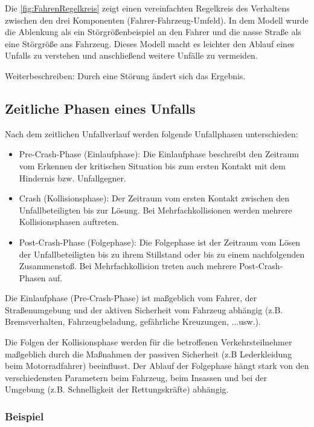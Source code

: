 Die \autoref{fig:FahrenRegelkreis} zeigt einen vereinfachten Regelkreis des Verhaltens zwischen den drei Komponenten (Fahrer-Fahrzeug-Umfeld). In dem Modell wurde die Ablenkung als ein Störgrößenbeispiel an den Fahrer und die nasse Straße als eine Störgröße ans Fahrzeug. Dieses Modell macht es leichter den Ablauf eines Unfalls zu verstehen und anschließend weitere Unfälle zu vermeiden.

Weiterbeschreiben: Durch eine Störung ändert sich das Ergebnis.

%
\subsection{Zeitliche Phasen eines Unfalls}

Nach dem zeitlichen Unfallverlauf werden folgende Unfallphasen unterschieden:
\begin{itemize}
	\item Pre-Crash-Phase (Einlaufphase): 
	Die Einlaufphase beschreibt den Zeitraum vom Erkennen der kritischen Situation bis zum ersten Kontakt mit dem Hindernis bzw. Unfallgegner.
	\item Crash (Kollisionsphase):
	Der Zeitraum vom ersten Kontakt zwischen den Unfallbeteiligten bis zur Lösung. Bei Mehrfachkollisionen werden mehrere Kollisionsphasen auftreten.
	\item Post-Crash-Phase (Folgephase):
	Die Folgephase ist der Zeitraum vom Lösen der Unfallbeteiligten bis zu ihrem Stillstand oder bis zu einem nachfolgenden Zusammenstoß. Bei Mehrfachkollision treten auch mehrere Post-Crash-Phasen auf. 
	
\end{itemize}
Die Einlaufphase (Pre-Crash-Phase) ist maßgeblich vom Fahrer, der Straßenumgebung und der aktiven Sicherheit vom Fahrzeug abhängig (z.B. Bremsverhalten, Fahrzeugbeladung, gefährliche Kreuzungen, ...usw.).
 
Die Folgen der Kollisionsphase werden für die betroffenen Verkehrsteilnehmer maßgeblich durch die Maßnahmen der passiven Sicherheit (z.B Lederkleidung beim Motorradfahrer) beeinflusst. Der Ablauf der Folgephase hängt stark von den verschiedensten Parametern beim Fahrzeug, beim Insassen und bei der Umgebung (z.B. Schnelligkeit der Rettungskräfte) abhängig.\cite{Appel2002}\\


\subsubsection{Beispiel}

